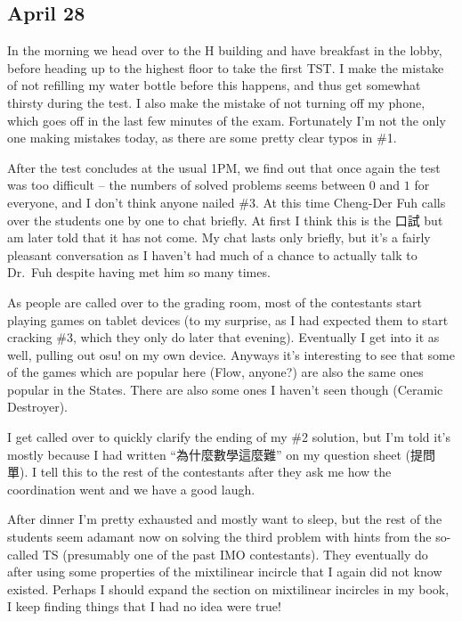 \documentclass[11pt]{scrreprt}
\begin{document}
\subsection{April 28}
In the morning we head over to the H building and have breakfast in the lobby, before heading up to the highest floor to take the first TST.
I make the mistake of not refilling my water bottle before this happens, and thus get somewhat thirsty during the test.
I also make the mistake of not turning off my phone, which goes off in the last few minutes of the exam.
Fortunately I'm not the only one making mistakes today, as there are some pretty clear typos in \#1.

After the test concludes at the usual 1PM, we find out that once again the test was too difficult -- the numbers of solved problems seems between $0$ and $1$ for everyone, and I don't think anyone nailed \#3.
At this time Cheng-Der Fuh calls over the students one by one to chat briefly. At first I think this is the 口試 but am later told that it has not come.
My chat lasts only briefly, but it's a fairly pleasant conversation as I haven't had much of a chance to actually talk to Dr.\ Fuh despite having met him so many times.

As people are called over to the grading room, most of the contestants start playing games on tablet devices (to my surprise, as I had expected them to start cracking \#3, which they only do later that evening). Eventually I get into it as well, pulling out {osu!} on my own device.
Anyways it's interesting to see that some of the games which are popular here (Flow, anyone?) are also the same ones popular in the States.
There are also some ones I haven't seen though (Ceramic Destroyer).

I get called over to quickly clarify the ending of my \#2 solution, but I'm told it's mostly because I had written ``為什麼數學這麼難'' on my question sheet (提問單). I tell this to the rest of the contestants after they ask me how the coordination went and we have a good laugh.

After dinner I'm pretty exhausted and mostly want to sleep, but the rest of the students seem adamant now on solving the third problem with hints from the so-called TS (presumably one of the past IMO contestants). They eventually do after using some properties of the mixtilinear incircle that I again did not know existed. Perhaps I should expand the section on mixtilinear incircles in my book, I keep finding things that I had no idea were true!
\end{document}

